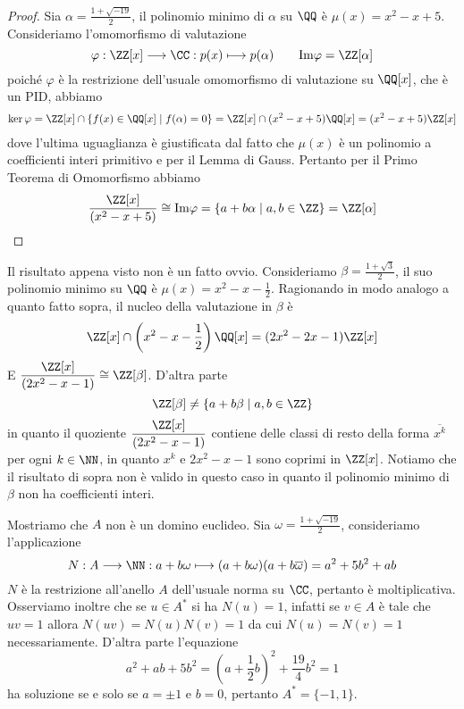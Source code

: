 \documentclass[11pt]{scrartcl}
\begin{document}
\begin{proof}
    Sia $\alpha = \displaystyle\frac{1 + \sqrt{-19}}{2}$, il polinomio minimo di $\alpha$
    su $\QQ$ è $\mu(x) = x^2 - x + 5$. Consideriamo l'omomorfismo di valutazione
    \[
        \varphi: \ZZ[x]\longrightarrow \CC: p(x) \longmapsto p(\alpha) 
        \qquad \mathrm{Im\varphi} = \ZZ[\alpha]
    \]
    poiché $\varphi$ è la restrizione dell'usuale omomorfismo di valutazione
    su $\QQ[x]$, che è un PID, abbiamo
    \begin{multline*}
        \ker \varphi = \ZZ[x] \cap \{f(x) \in \QQ[x]\mid f(\alpha) = 0\}
        = \ZZ[x] \cap (x^2 - x + 5)\QQ[x] = (x^2 - x + 5)\ZZ[x]
    \end{multline*}
    dove l'ultima uguaglianza è giustificata dal fatto che $\mu(x)$ è un 
    polinomio a coefficienti interi primitivo e per il Lemma di Gauss.
    Pertanto per il Primo Teorema di Omomorfismo abbiamo 
    \[
        \frac{\ZZ[x]}{(x^2 - x + 5)} \cong \mathrm{Im\varphi} = 
        \{a + b\alpha \mid a, b \in \ZZ\} = \ZZ[\alpha]
    \]
\end{proof}

\begin{remark}
    Il risultato appena visto non è un fatto ovvio. Consideriamo $\beta = 
    \displaystyle\frac{1 + \sqrt{3}}{2}$,
    il suo polinomio minimo su $\QQ$ è $\displaystyle\mu(x) = x^2 - x - \frac 1 2$.
    Ragionando in modo analogo a quanto fatto sopra, il nucleo della valutazione
    in $\beta$ è 
    \[
        \ZZ[x] \cap \left(x^2 - x - \frac 1 2\right)\QQ[x] =(2x^2 - 2x - 1)\ZZ[x]
    \]
    E $\displaystyle\frac{\ZZ[x]}{(2x^2 - x - 1)} \cong \ZZ[\beta]$.
    D'altra parte 
    \[
        \ZZ[\beta] \neq \{a + b\beta\mid a, b \in \ZZ\}
    \]
    in quanto il quoziente $\displaystyle\frac{\ZZ[x]}{(2x^2 - x - 1)}$
    contiene delle classi di resto della forma $\overline{x^k}$ per ogni $k \in \NN$,
    in quanto $x^k$ e $2x^2 - x - 1$ sono coprimi in $\ZZ[x]$. Notiamo che
    il risultato di sopra non è valido in questo caso in quanto il polinomio
    minimo di $\beta$ non ha coefficienti interi.
\end{remark}

Mostriamo che $A$ non è un domino euclideo. Sia $\omega = 
\displaystyle\frac{1 + \sqrt{-19}}{2}$, consideriamo l'applicazione
\[
    N: A \longrightarrow \NN: a + b\omega \longmapsto (a + b\omega)(a + b\overline{\omega}) =
    a^2 + 5b^2 + ab
\]
$N$ è la restrizione all'anello $A$ dell'usuale norma su $\CC$,
pertanto è moltiplicativa. Osserviamo inoltre che se $u \in A^*$ si ha 
$N(u)= 1$, infatti se $v \in A$ è tale che $uv = 1$ allora $N(uv) = N(u)N(v) = 1$
da cui $N(u) = N(v) = 1$ necessariamente. D'altra parte l'equazione 
\[
    a^2 + ab + 5b^2 = \left(a + \frac 1 2 b\right)^2 + \frac{19}{4} b^2 = 1
\]
ha soluzione se e solo se $a = \pm 1$ e $b = 0$, pertanto $A^* = \{-1, 1\}$.
\end{document}

